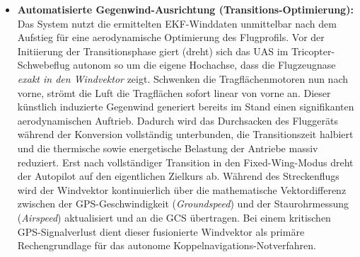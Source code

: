 \begin{itemize}
    \item \textbf{Automatisierte Gegenwind-Ausrichtung (Transitions-Optimierung):} Das System nutzt die ermittelten EKF-Winddaten unmittelbar nach dem Aufstieg für eine aerodynamische Optimierung des Flugprofils. 
                                                                                   Vor der Initiierung der Transitionsphase giert (dreht) sich das UAS im Tricopter-Schwebeflug autonom so um die eigene Hochachse, 
                                                                                   dass die Flugzeugnase \textit{exakt in den Windvektor} zeigt. Schwenken die Tragflächenmotoren nun nach vorne, strömt die Luft die Tragflächen sofort linear von vorne an. 
                                                                                   Dieser künstlich induzierte Gegenwind generiert bereits im Stand einen signifikanten aerodynamischen Auftrieb. 
                                                                                   Dadurch wird das Durchsacken des Fluggeräts während der Konversion vollständig unterbunden, die Transitionszeit halbiert und die thermische sowie energetische Belastung 
                                                                                   der Antriebe massiv reduziert. Erst nach vollständiger Transition in den Fixed-Wing-Modus dreht der Autopilot auf den eigentlichen Zielkurs ab. 
                                                                                   Während des Streckenflugs wird der Windvektor kontinuierlich über die mathematische Vektordifferenz zwischen der GPS-Geschwindigkeit (\textit{Groundspeed}) 
                                                                                   und der Staurohrmessung (\textit{Airspeed}) aktualisiert und an die GCS übertragen. Bei einem kritischen GPS-Signalverlust dient dieser fusionierte Windvektor 
                                                                                   als primäre Rechengrundlage für das autonome Koppelnavigations-Notverfahren.
\end{itemize}



